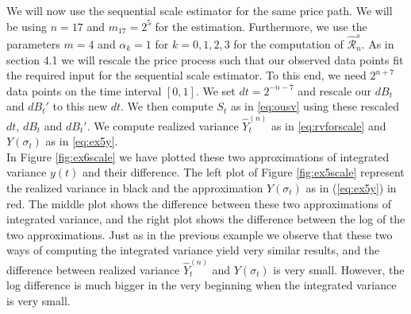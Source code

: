 \documentclass{article}
\begin{document}
We will now use the sequential scale estimator for the same price path. We will be using $n=17$ and $m_{17}=2^5$ for the estimation. Furthermore, we use the parameters $m=4$ and $\alpha_k=1$ for $k=0,1,2,3$ for the computation of $\widehat{\mathscr{R}}_n^s$. As in section 4.1 we will rescale the price process such that our observed data points fit the required input for the sequential scale estimator. To this end, we need $2^{n+7}$ data points on the time interval $[0,1]$. We set $dt=2^{-n-7}$ and rescale our $dB_t$ and $dB_t'$ to this new $dt$. We then compute $S_t$ as in \eqref{eq:ousv} using these rescaled $dt$, $dB_t$ and $dB_t'$. We compute realized variance $\hat{Y}_t^{(n)}$ as in \eqref{eq:rvforscale} and $Y(\sigma_t)$ as in \eqref{eq:ex5y}. \\
In Figure \ref{fig:ex6scale} we have plotted these two approximations of integrated variance $y(t)$ and their difference. The left plot of Figure \ref{fig:ex5scale} represent the realized variance in black and the approximation $Y(\sigma_t)$ as in (\ref{eq:ex5y}) in red. The middle plot shows the difference between these two approximations of integrated variance, and the right plot shows the difference between the log of the two approximations. Just as in the previous example we observe that these two ways of computing the integrated variance yield very similar results, and the difference between realized variance $\hat{Y}_t^{(n)}$ and $Y(\sigma_t)$ is very small. However, the log difference is much bigger in the very beginning when the integrated variance is very small.
\end{document}

